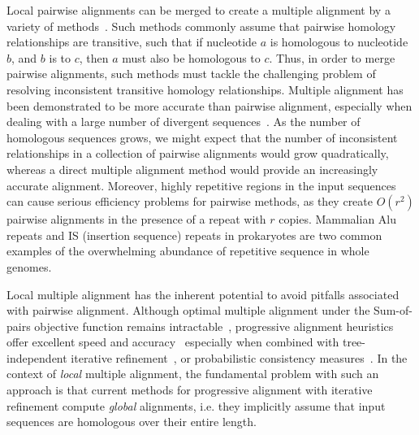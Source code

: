 \documentclass[9.5pt,journal,final,finalsubmission,twocolumn]{IEEEtran}
\begin{document}
Local pairwise alignments can be merged to create a multiple alignment by a variety of
methods~\cite{ref-tba,ref-dialign,ref-related1}. Such methods commonly assume that pairwise homology relationships are transitive, such that if nucleotide $a$ is homologous to nucleotide $b$, and $b$ is to $c$, then $a$ must also be homologous to $c$.  Thus, in order to merge pairwise alignments, such methods must tackle the challenging problem of resolving inconsistent transitive homology relationships.
Multiple alignment has been demonstrated to be more accurate than pairwise alignment, especially when dealing with a large number of divergent sequences~\cite{ref-mlagan,ref-aubergene}.  As the number of homologous sequences grows, we might expect that the number of inconsistent relationships in a collection of pairwise alignments would grow quadratically, whereas a direct multiple alignment method would provide an increasingly accurate alignment.  Moreover, highly repetitive regions in the input sequences can cause serious efficiency
problems for pairwise methods, as they create $O(r^{2})$ pairwise alignments in the presence of a repeat with $r$ copies.  Mammalian Alu repeats and IS (insertion sequence) repeats in prokaryotes are two common examples of the overwhelming abundance of repetitive sequence in whole genomes.

Local multiple alignment has the inherent potential to avoid pitfalls associated with pairwise alignment. Although optimal multiple alignment under the Sum-of-pairs objective function remains intractable~\cite{ref-wangjiang}, progressive alignment heuristics offer excellent speed and accuracy~\cite{ref-clustalw,ref-tcoffee} especially when combined with tree-independent iterative
refinement~\cite{ref-muscle}, or probabilistic consistency measures~\cite{ref-probcons}. In the context of \textit{local}
multiple alignment, the fundamental problem with such an approach is
that current methods for progressive alignment with iterative
refinement compute \textit{global} alignments, i.e. they implicitly
assume that input sequences are homologous over their entire length.
\end{document}
